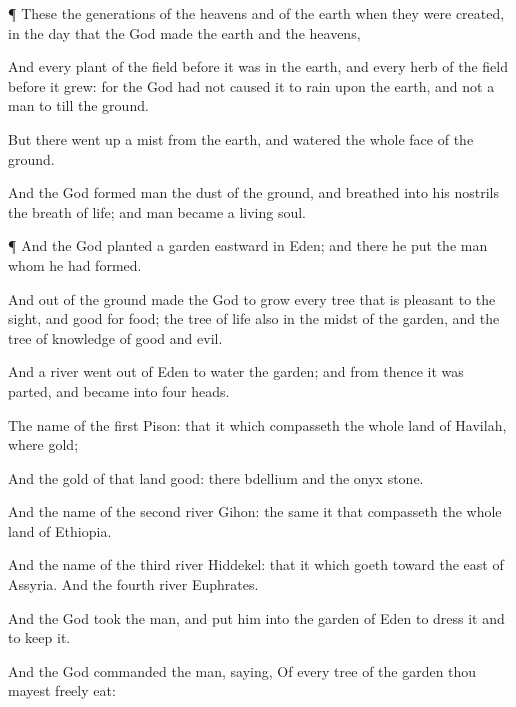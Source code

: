 {\par }{\PP {}¶
These
{} the
generations of the
heavens and of the
earth when they were
created, in the
day that the
{}
God
made the
earth and the
heavens,

And every
plant of the
field
before it was in the
earth, and every
herb of the
field
before it
grew:
for the
{}
God had
not caused it to
rain upon the
earth, and
{}
not a
man to
till the
ground.

But there went
up a
mist
from the
earth, and
watered the whole
face of the
ground.

And the
{}
God
formed
man
{} the
dust
of the
ground, and
breathed into his
nostrils the
breath of
life; and
man became a
living
soul.


\par }{\PP {}¶ And the
{}
God
planted a
garden
eastward in
Eden; and
there he
put the
man
whom he had
formed.

And
out of the
ground
made the
{}
God to
grow every
tree that is
pleasant to the
sight, and
good for
food; the
tree of
life also in the
midst of the
garden, and the
tree of
knowledge of
good and
evil.

And a
river went
out of
Eden to
water the
garden; and from thence it was
parted, and became into
four
heads.

The
name of the
first
{}
Pison:
that
{} it which
compasseth the whole
land of
Havilah,
where
{}
gold;

And the
gold of
that
land
{}
good: there
{}
bdellium and the
onyx
stone.

And the
name of the
second
river
{}
Gihon: the same
{} it that
compasseth the whole
land of
Ethiopia.

And the
name of the
third
river
{}
Hiddekel: that
{} it which goeth
toward the
east of
Assyria. And the
fourth
river
{}
Euphrates.

And the
{}
God
took the
man, and put
him into the
garden of
Eden to
dress it and to
keep it.


\par }{\PP {}And the
{}
God
commanded the
man,
saying, Of every
tree of the
garden thou mayest
freely
eat:

}
